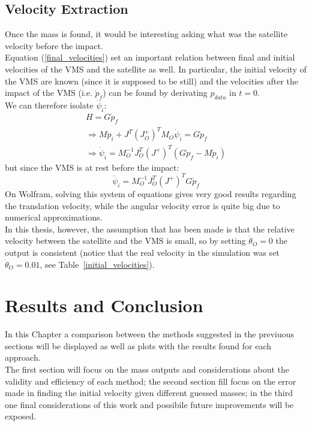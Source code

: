 \documentclass[a4paper,12pt,oneside]{report}
\begin{document}
\section{Velocity Extraction}
Once the mass is found, it would be interesting asking what was the satellite velocity before the impact.\\
Equation (\ref{final_velocities}) set an important relation between final and initial velocities of the VMS and the satellite as well. In particular, the initial velocity of the VMS are known (since it is supposed to be still) and the velocities after the impact of the VMS (i.e. $\dot{p}_f$) can be found by derivating $p_{data}$ in $t=0$.\\
We can therefore isolate $\dot{\psi}_i$:
\begin{equation}
  \begin{array}{l}
    H=G\dot{p}_f\\
    \Rightarrow M\dot{p}_i+J^T(J_O^+)^TM_O\dot{\psi}_i=G\dot{p}_f\\
    \Rightarrow \dot{\psi}_i=M_O^{-1}J_O^T(J^+)^T(G\dot{p}_f-M\dot{p}_i)
  \end{array}
\end{equation}
but since the VMS is at rest before the impact:
\begin{equation}
  \dot{\psi}_i=M_O^{-1}J_O^T(J^+)^TG\dot{p}_f
\end{equation}
On Wolfram, solving this system of equations gives very good results regarding the translation velocity, while the angular velocity error is quite big due to numerical approximations.\\
In this thesis, however, the assumption that has been made is that the relative velocity between the satellite and the VMS is small, so by setting $\dot{\theta}_O=0$ the output is consistent (notice that the real velocity in the simulation was set $\dot{\theta}_O=0.01$, see Table~\ref{initial_velocities}).
\chapter{Results and Conclusion}
In this Chapter a comparison between the methods suggested in the previuous sections will be displayed as well as plots with the results found for each approach.\\
The first section will focus on the mass outputs and considerations about the validity and efficiency of each method; the second section fill focus on the error made in finding the initial velocity given different guessed masses; in the third one final considerations of this work and possibile future improvements will be exposed.
\newpage
\end{document}
